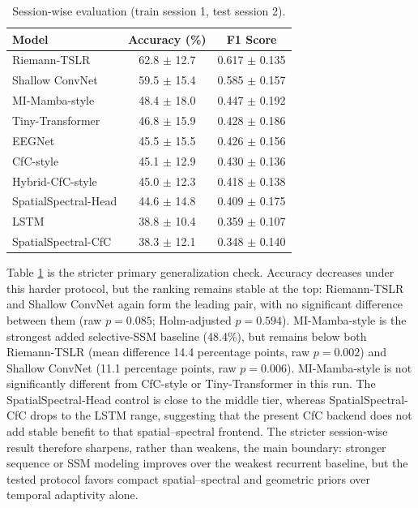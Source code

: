 \documentclass[journal]{IEEEtran}
\begin{document}
\begin{table}[t]
  \centering
  \footnotesize
  \caption{Session-wise evaluation (train session 1, test session 2).}
  \begin{tabular}{lcc}
    \toprule
    \textbf{Model} & \textbf{Accuracy (\%)} & \textbf{F1 Score} \\
    \midrule
    Riemann-TSLR & 62.8 $\pm$ 12.7 & 0.617 $\pm$ 0.135 \\
    Shallow ConvNet & 59.5 $\pm$ 15.4 & 0.585 $\pm$ 0.157 \\
    MI-Mamba-style & 48.4 $\pm$ 18.0 & 0.447 $\pm$ 0.192 \\
    Tiny-Transformer & 46.8 $\pm$ 15.9 & 0.428 $\pm$ 0.186 \\
    EEGNet & 45.5 $\pm$ 15.5 & 0.426 $\pm$ 0.156 \\
    CfC-style & 45.1 $\pm$ 12.9 & 0.430 $\pm$ 0.136 \\
    Hybrid-CfC-style & 45.0 $\pm$ 12.3 & 0.418 $\pm$ 0.138 \\
    SpatialSpectral-Head & 44.6 $\pm$ 14.8 & 0.409 $\pm$ 0.175 \\
    LSTM & 38.8 $\pm$ 10.4 & 0.359 $\pm$ 0.107 \\
    SpatialSpectral-CfC & 38.3 $\pm$ 12.1 & 0.348 $\pm$ 0.140 \\
    \bottomrule
  \end{tabular}
  \label{tab:sessionwise}
\end{table}

Table \ref{tab:sessionwise} is the stricter primary generalization check. Accuracy decreases under this harder protocol, but the ranking remains stable at the top: Riemann-TSLR and Shallow ConvNet again form the leading pair, with no significant difference between them (raw $p = 0.085$; Holm-adjusted $p = 0.594$). MI-Mamba-style is the strongest added selective-SSM baseline (48.4\%), but remains below both Riemann-TSLR (mean difference 14.4 percentage points, raw $p = 0.002$) and Shallow ConvNet (11.1 percentage points, raw $p = 0.006$). MI-Mamba-style is not significantly different from CfC-style or Tiny-Transformer in this run. The SpatialSpectral-Head control is close to the middle tier, whereas SpatialSpectral-CfC drops to the LSTM range, suggesting that the present CfC backend does not add stable benefit to that spatial--spectral frontend. The stricter session-wise result therefore sharpens, rather than weakens, the main boundary: stronger sequence or SSM modeling improves over the weakest recurrent baseline, but the tested protocol favors compact spatial--spectral and geometric priors over temporal adaptivity alone.
\end{document}
